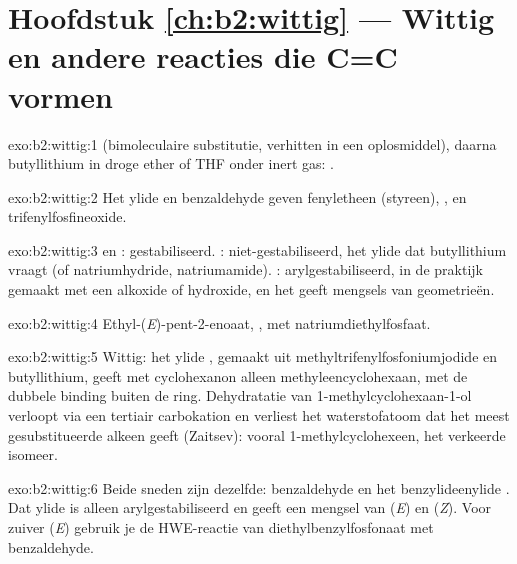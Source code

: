 \section*{Hoofdstuk \ref{ch:b2:wittig} --- Wittig en andere reacties die C=C vormen}

\begin{solution}{exo:b2:wittig:1}
 (bimoleculaire substitutie, verhitten in een oplosmiddel), daarna
butyllithium in droge ether of THF onder inert gas: .
\end{solution}

\begin{solution}{exo:b2:wittig:2}
Het ylide  en benzaldehyde geven fenyletheen (styreen), , en
trifenylfosfineoxide.
\end{solution}

\begin{solution}{exo:b2:wittig:3}
 en : gestabiliseerd. : niet-gestabiliseerd, het ylide dat
butyllithium vraagt (of natriumhydride, natriumamide). : arylgestabiliseerd, in de praktijk gemaakt met een
alkoxide of hydroxide, en het geeft mengsels van geometrieën.
\end{solution}

\begin{solution}{exo:b2:wittig:4}
Ethyl-(\textit{E})-pent-2-enoaat, , met natriumdiethylfosfaat.
\end{solution}

\begin{solution}{exo:b2:wittig:5}
Wittig: het ylide , gemaakt uit methyltrifenylfosfoniumjodide en butyllithium, geeft met cyclohexanon alleen
methyleencyclohexaan, met de dubbele binding buiten de ring. Dehydratatie van 1-methylcyclohexaan-1-ol verloopt
via een tertiair carbokation en verliest het waterstofatoom dat het meest gesubstitueerde alkeen geeft (Zaitsev):
vooral 1-methylcyclohexeen, het verkeerde isomeer.
\end{solution}

\begin{solution}{exo:b2:wittig:6}
Beide sneden zijn dezelfde: benzaldehyde en het benzylideenylide . Dat ylide is alleen
arylgestabiliseerd en geeft een mengsel van (\textit{E}) en (\textit{Z}). Voor zuiver (\textit{E}) gebruik je de HWE-reactie
van diethylbenzylfosfonaat met benzaldehyde.
\end{solution}

